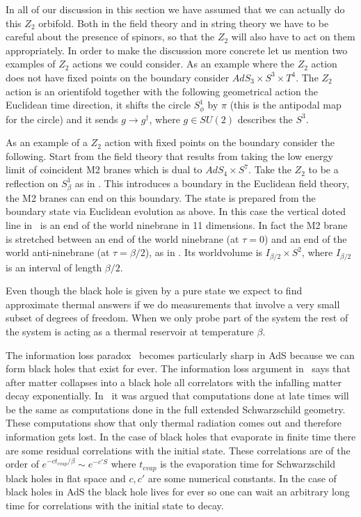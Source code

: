 In all of our discussion in this section we have assumed that 
we can actually do this $Z_2$ orbifold.  
Both in the field theory and
in string theory we have
to be careful about the presence of spinors, so that the $Z_2$ 
will also have to act  on them appropriately. 
In order to make the discussion more concrete let us mention two 
examples of $Z_2$ actions we could consider. 
As an example where the $Z_2$ action does not have fixed points
on the boundary 
consider $AdS_3 \times S^3 \times T^4$. The $Z_2$ action is an 
orientifold together with the following geometrical action 
 the Euclidean time direction, it shifts the circle $S^1_\phi$
by $\pi$ (this is the antipodal map for the circle) and it sends
$g \to g^\dagger$, where $g\in SU(2)$ describes the $S^3$.

As an example of a $Z_2$ action with fixed points on the boundary 
consider the following. 
Start from  the field theory that results from taking the low energy
limit of coincident M2 branes which is dual to $AdS_4 \times S^7$.  
Take the $Z_2$ to be a  reflection on $S^1_\beta$ as in 
\hw . This introduces a boundary in the Euclidean 
field theory, the M2 branes
can end on this boundary. The state is prepared from the boundary
state via Euclidean evolution as above. In this case the
vertical doted line in \geon\ is an end of the world ninebrane in
11 dimensions. In fact the M2 brane is stretched between an end
of the world ninebrane (at $\tau=0$) 
and an end of the world anti-ninebrane (at $\tau=\beta/2$), 
as in \hfa .
Its 
worldvolume is $I_{\beta/2} \times S^2$, where $I_{\beta/2}$ is
an interval of length $\beta/2$. 

Even though the black hole is given by a pure state we 
expect to find approximate thermal answers if we do measurements
that involve a very small subset of degrees of freedom. 
When we   only 
probe part of the system  the rest of the system is acting
as a thermal reservoir at temperature $\beta$.






The information loss paradox \hawkinginfo\ becomes particularly sharp
in AdS because we can form black holes that exist for ever. 
The information loss argument in \hawkinginfo\ says that after 
matter collapses into a  black hole all correlators with the
infalling matter decay exponentially. In \hh\ it was argued that
 computations done at late times will be the same as 
computations done in the full extended Schwarzschild geometry. These
computations show that only thermal radiation comes out and therefore
information gets lost. In the case of black holes that evaporate in finite
time there are some residual correlations with the initial state.
These  correlations are of the order of 
$e^{-c t_{evap}/\beta} \sim e^{- c' S}$ where $t_{evap}$ is 
the evaporation
time for  Schwarzschild black holes in flat space 
 and $c,c'$ are some numerical constants.  
In the case of black holes in AdS the black hole lives for ever so 
one can wait an arbitrary long time for correlations with the initial state
to decay. 

